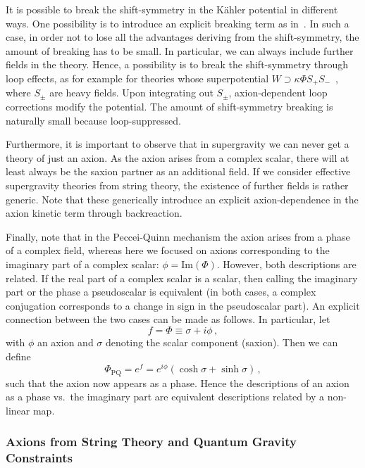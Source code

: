 It is possible to break the shift-symmetry in the K\"ahler potential in different ways. One possibility is to introduce an explicit breaking term as in~\cite{Ferrara:2010yw,Ferrara:2010in,Buchmuller:2012ex}. In such a case, in order not to lose all the advantages deriving from the shift-symmetry, the amount of breaking has to be small. In particular, we can always include further fields in the theory. Hence, a possibility is to break the shift-symmetry through loop effects, as for example for theories whose superpotential $W \supset \kappa \Phi S_+ S_-$~\cite{Gaillard:1993es,Stewart:1996ey,Stewart:1997wg}, where $S_\pm$ are heavy fields. Upon integrating out $S_{\pm}$, axion-dependent loop corrections modify the \Kahler potential. The amount of shift-symmetry breaking is naturally small because loop-suppressed. 

Furthermore, it is important to observe that in supergravity we can never get a theory of just an axion. As the axion arises from a complex scalar, there will at least always be the saxion partner as an additional field. If we consider effective supergravity theories from string theory, the existence of further fields is rather generic. Note that these generically introduce an explicit axion-dependence in the axion kinetic term through backreaction. 

Finally, note that in the Peccei-Quinn mechanism the axion arises from a phase of a complex field, whereas here we focused on axions corresponding to the imaginary part of a complex scalar: $\phi= \text{Im}(\Phi)$. However, both descriptions are related. If the real part of a complex scalar is a scalar, then calling the imaginary part or the phase a pseudoscalar is equivalent (in both cases, a complex conjugation corresponds to a change in sign in the pseudoscalar part). An explicit connection between the two cases can be made as follows. In particular, let
\begin{equation}
f= \Phi \equiv \sigma + i \phi \, ,
\end{equation}
with $\phi$ an axion and $\sigma$ denoting the scalar component (saxion). Then we can define
\begin{equation}
\Phi_{\textrm{PQ}} = e^{f} = e^{i \phi} (\cosh \sigma + \sinh \sigma) \, ,
\end{equation}
such that the axion now appears as a phase.
Hence the descriptions of an axion as a phase vs.~the imaginary part are equivalent descriptions related by a non-linear map.

\subsubsection*{Axions from String Theory and Quantum Gravity Constraints}

